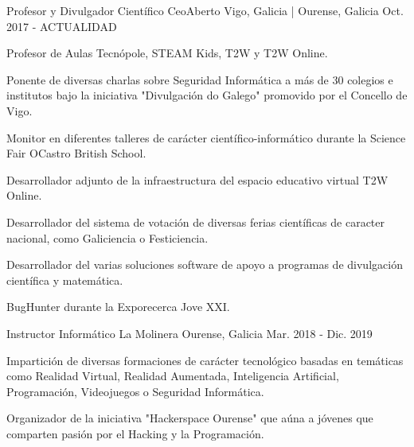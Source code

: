 \documentclass[11pt, a4paper]{style}
\begin{document}
\begin{cventries}
    \vspace{0.1cm}
  \cventry
    {Profesor y Divulgador Científico} %
    {CeoAberto} %
    {Vigo, Galicia | Ourense, Galicia} %
    {Oct. 2017 - ACTUALIDAD} %
    {
      \begin{cvitems} %
        \item {Profesor de Aulas Tecnópole, STEAM Kids, T2W y T2W Online.}
        \item {Ponente de diversas charlas sobre Seguridad Informática a más de 30 colegios e institutos bajo la iniciativa "Divulgación do Galego" promovido por el Concello de Vigo.}
        \item {Monitor en diferentes talleres de carácter científico-informático durante la Science Fair OCastro British School.}
        \item {Desarrollador adjunto de la infraestructura del espacio educativo virtual T2W Online.}
        \item {Desarrollador del sistema de votación de diversas ferias científicas de caracter nacional, como Galiciencia o Festiciencia.}
        \item {Desarrollador del varias soluciones software de apoyo a programas de divulgación científica y matemática.}
        \item {BugHunter durante la Exporecerca Jove XXI.}
      \end{cvitems}
    }
    \vspace{0.1cm}
  \cventry
    {Instructor Informático} %
    {La Molinera} %
    {Ourense, Galicia} %
    {Mar. 2018 - Dic. 2019} %
    {
      \begin{cvitems} %
        \item {Impartición de diversas formaciones de carácter tecnológico basadas en temáticas como Realidad Virtual, Realidad Aumentada, Inteligencia Artificial, Programación, Videojuegos o Seguridad Informática.}
        \item {Organizador de la iniciativa "Hackerspace Ourense" que aúna a jóvenes que comparten pasión por el Hacking y la Programación.}
      \end{cvitems}
    }
    \vspace{0.1cm}

\end{cventries}
\end{document}

